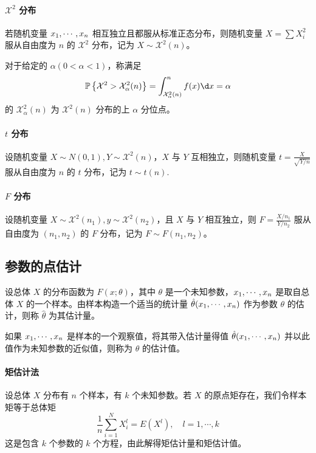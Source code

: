 \newcommand{\calX}{\mathcal{X}}

\paragraph{$\calX^2$ 分布}

若随机变量 $x_1,\cdots,x_n$ 相互独立且都服从标准正态分布，则随机变量 $X = \sum X_i^2$ 服从自由度为 $n$ 的 $\calX^2$ 分布，记为 $X \sim \calX^2(n)$。

对于给定的 $\alpha(0 < \alpha < 1)$，称满足
\[ \bbP\left\{\calX^2 > \calX_\alpha^2(n)\right\} = \int_{\calX_\alpha^2(n)}^n f(x) \d x = \alpha  \]
的 $\calX_\alpha^2(n)$ 为 $\calX^2(n)$ 分布的上 $\alpha$ 分位点。

\paragraph{$t$ 分布}

设随机变量 $X \sim N(0, 1), Y \sim \calX^2(n)$，$X$ 与 $Y$ 互相独立，则随机变量 $t = \frac{X}{\sqrt{Y / n}}$ 服从自由度为 $n$ 的 $t$ 分布，记为 $t \sim t(n)$.

\paragraph{$F$ 分布}

设随机变量 $X \sim \calX^2(n_1), y \sim \calX^2(n_2)$，且 $X$ 与 $Y$ 相互独立，则 $F = \frac{X / n_1}{Y / n_2}$ 服从自由度为 $(n_1, n_2)$ 的 $F$ 分布，记为 $F \sim F(n_1, n_2)$。

\subsection{参数的点估计}

设总体 $X$ 的分布函数为 $F(x; \theta)$，其中 $\theta$ 是一个未知参数，$x_1,\cdots,x_n$ 是取自总体 $X$ 的一个样本。由样本构造一个适当的统计量 $\hat{\theta}(x_1,\cdots,x_n)$ 作为参数 $\theta$ 的估计，则称 $\hat{\theta}$ 为其估计量。

如果 $x_1,\cdots,x_n$ 是样本的一个观察值，将其带入估计量得值 $\hat{\theta}(x_1,\cdots,x_n)$ 并以此值作为未知参数的近似值，则称为 $\theta$ 的估计值。

\paragraph{矩估计法}

设总体 $X$ 分布有 $n$ 个样本，有 $k$ 个未知参数。若 $X$ 的原点矩存在，我们令样本矩等于总体矩
\[ \frac{1}{n} \sum_{i=1}^{N} X_i^l = E(X^l), \quad l = 1, \cdots, k \]
这是包含 $k$ 个参数的 $k$ 个方程，由此解得矩估计量和矩估计值。

